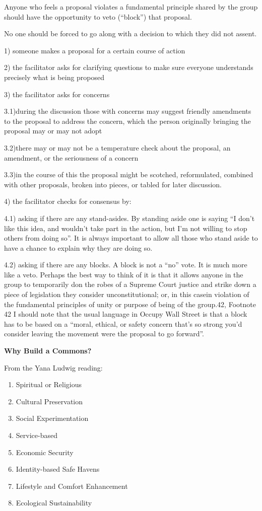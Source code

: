 \documentclass{article}
\begin{document}
Anyone who feels a proposal violates a fundamental principle shared by the group should have the opportunity to veto (“block”) that proposal.

No one should be forced to go along with a decision to which they did not assent.

1) someone makes a proposal for a certain course of action

2) the facilitator asks for clarifying questions to make sure everyone understands precisely what is being proposed

3) the facilitator asks for concerns

3.1)during the discussion those with concerns may suggest friendly amendments to the proposal to address the concern, which the person originally bringing the proposal may or may not adopt

3.2)there may or may not be a temperature check about the proposal, an amendment, or the seriousness of a concern

3.3)in the course of this the proposal might be scotched, reformulated, combined with other proposals, broken into pieces, or tabled for later discussion.

4) the facilitator checks for consensus by:

4.1) asking if there are any stand-asides. By standing aside one is saying “I don’t like this idea, and wouldn’t take part in the action, but I’m not willing to stop others from doing so”. It is always important to allow all those who stand aside to have a chance to explain why they are doing so.

4.2) asking if there are any blocks. A block is not a “no” vote. It is much more like a veto. Perhaps the best way to think of it is that it allows anyone in the group to temporarily don the robes of a Supreme Court justice and strike down a piece of legislation they consider unconstitutional; or, in this casein violation of the fundamental principles of unity or purpose of being of the group.{42},
Footnote {42} I should note that the usual language in Occupy Wall Street is that a block has to be based on a “moral, ethical, or safety concern that’s so strong you’d consider leaving the movement were the proposal to go forward”.

\pagebreak
{\huge \textbf{Why Build a Commons?}}

From the Yana Ludwig reading:

\begin{enumerate}
	\item Spiritual or Religious
	\item 	Cultural Preservation
	\item 	Social Experimentation
	\item 	Service-based
	\item 	Economic Security
	\item 	Identity-based Safe Havens
	\item 	Lifestyle and Comfort Enhancement
	\item 	Ecological Sustainability
\end{enumerate}
\end{document}
